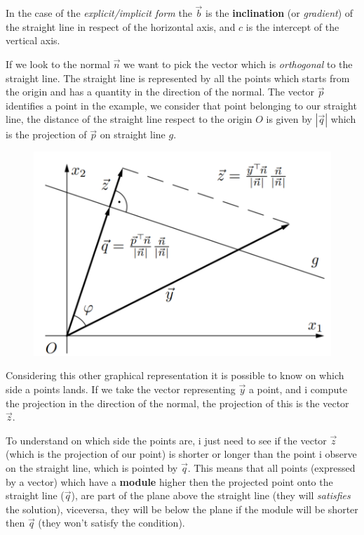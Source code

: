\documentclass{article}
\begin{document}
In the case of the \textit{explicit/implicit form} the $\vec{b}$ is the \textbf{inclination}
(or \textit{gradient}) of the straight line in respect of the horizontal axis,
and $c$ is the intercept of the vertical axis.

If we look to the normal $\vec{n}$ we want to pick the vector which is \textit{orthogonal}
to the straight line. The straight line is represented by all the points which starts from the
origin and has a quantity in the direction of the normal. The vector $\vec{p}$ identifies a
point in the example, we consider that point belonging to our straight line,
the distance of the straight line respect to the origin $O$ is given by $|\vec{q}|$ which is
the projection of $\vec{p}$ on straight line $g$.

\begin{figure}[H]
    \centering
    \includegraphics[scale=1]{images/geom2.png}
    \label{fig:geom_2}
\end{figure}

Considering this other graphical representation it is possible to know on which side
a points lands. If we take the vector representing $\vec{y}$ a point,
and i compute the projection in the direction of the normal, the projection
of this is the vector $\vec{z}$.

To understand on which side the points are, i just need to see if the vector $\vec{z}$ (which is the
projection of our point) is shorter or longer than the point i observe on the straight line, which
is pointed by $\vec{q}$. This means that all points (expressed by a vector) which have a \textbf{module}
higher then the projected point onto the straight line ($\vec{q}$), are part of the plane above the
straight line (they will \textit{satisfies} the solution), viceversa, they will be below the plane if the
module will be shorter then $\vec{q}$ (they won't satisfy the condition).
\end{document}
